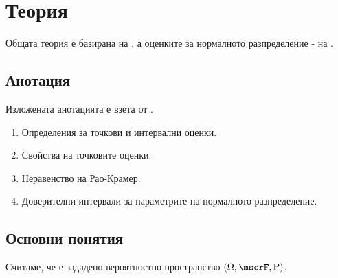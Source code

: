 \documentclass{../../common/topic}
\begin{document}
\maketitle

\section{Теория}

Общата теория е базирана на \cite{ДимитровЯнев2007}, а оценките за нормалното разпределение - на \cite{Въндев2002ЛекцииТом1}.

\subsection{Анотация}

Изложената анотацията е взета от \cite{Syllabus}.

\begin{enumerate}
  \item Определения за точкови и интервални оценки.
  \item Свойства на точковите оценки.
  \item Неравенство на Рао-Крамер.
  \item Доверителни интервали за параметрите на нормалното разпределение.
\end{enumerate}

\subsection{Основни понятия}

Считаме, че е зададено вероятностно пространство \( (\Omega, \mscrF, \Prob) \).
\end{document}
